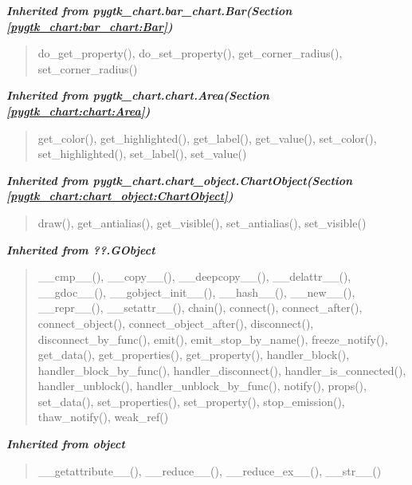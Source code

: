 \large{\textbf{\textit{Inherited from pygtk\_chart.bar\_chart.Bar\textit{(Section \ref{pygtk_chart:bar_chart:Bar})}}}}

\begin{quote}
do\_get\_property(), do\_set\_property(), get\_corner\_radius(), set\_corner\_radius()
\end{quote}

\large{\textbf{\textit{Inherited from pygtk\_chart.chart.Area\textit{(Section \ref{pygtk_chart:chart:Area})}}}}

\begin{quote}
get\_color(), get\_highlighted(), get\_label(), get\_value(), set\_color(), set\_highlighted(), set\_label(), set\_value()
\end{quote}

\large{\textbf{\textit{Inherited from pygtk\_chart.chart\_object.ChartObject\textit{(Section \ref{pygtk_chart:chart_object:ChartObject})}}}}

\begin{quote}
draw(), get\_antialias(), get\_visible(), set\_antialias(), set\_visible()
\end{quote}

\large{\textbf{\textit{Inherited from ??.GObject}}}

\begin{quote}
\_\_cmp\_\_(), \_\_copy\_\_(), \_\_deepcopy\_\_(), \_\_delattr\_\_(), \_\_gdoc\_\_(), \_\_gobject\_init\_\_(), \_\_hash\_\_(), \_\_new\_\_(), \_\_repr\_\_(), \_\_setattr\_\_(), chain(), connect(), connect\_after(), connect\_object(), connect\_object\_after(), disconnect(), disconnect\_by\_func(), emit(), emit\_stop\_by\_name(), freeze\_notify(), get\_data(), get\_properties(), get\_property(), handler\_block(), handler\_block\_by\_func(), handler\_disconnect(), handler\_is\_connected(), handler\_unblock(), handler\_unblock\_by\_func(), notify(), props(), set\_data(), set\_properties(), set\_property(), stop\_emission(), thaw\_notify(), weak\_ref()
\end{quote}

\large{\textbf{\textit{Inherited from object}}}

\begin{quote}
\_\_getattribute\_\_(), \_\_reduce\_\_(), \_\_reduce\_ex\_\_(), \_\_str\_\_()
\end{quote}


